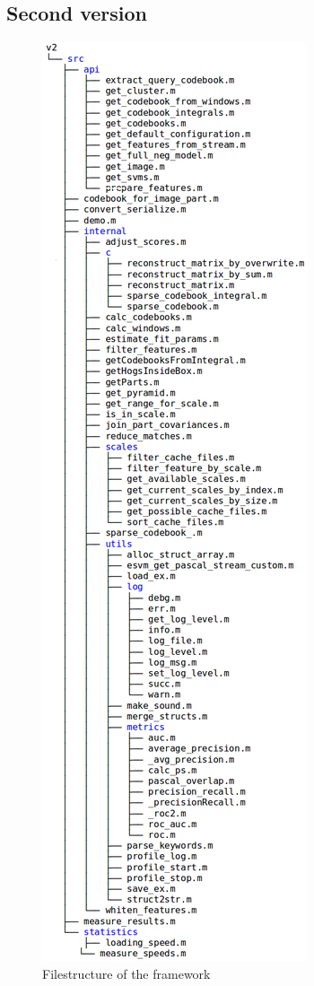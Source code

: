 \subsection{Second version}

\begin{figure}
\includegraphics[width=\textwidth]{content/pictures/v2_full}
\caption{Filestructure of the framework}
\label{fig:v2_full}
\end{figure}

